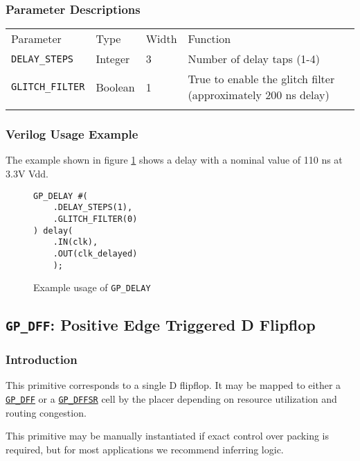 \documentclass[11pt]{article}
\newcommand{\tokenstyle}[1]{\texttt{#1}}
\newcommand{\whenstyle}[1]{{\fontseries{sb}\selectfont#1}}
\newcommand{\tokenref}[2]{\hyperref[#2]{\tokenstyle{#1}}}
\newcommand{\thinhline}{\Xhline{1\arrayrulewidth}}
\newcommand{\thickhline}{\Xhline{2.5\arrayrulewidth}}
\begin{document}
\subsubsection{Parameter Descriptions}

\begin{tabularx}{\textwidth}{lllX}
\thinhline
\whenstyle{Parameter} & \whenstyle{Type} & \whenstyle{Width} & \whenstyle{Function} \\
\thickhline
\tokenstyle{DELAY\_STEPS} & Integer & 3 & Number of delay taps (1-4) \\
\thinhline
\tokenstyle{GLITCH\_FILTER} & Boolean & 1 & True to enable the glitch filter (approximately 200 ns delay) \\
\thinhline
\end{tabularx}

\subsubsection{Verilog Usage Example}

The example shown in figure \ref{gp-delay-example} shows a delay with a nominal value of 110 ns at 3.3V Vdd.

\begin{figure}[h]
\begin{lstlisting}
GP_DELAY #(
	.DELAY_STEPS(1),
	.GLITCH_FILTER(0)
) delay(
	.IN(clk),
	.OUT(clk_delayed)
	);
\end{lstlisting}
\caption{Example usage of \tokenstyle{GP\_DELAY}}
\label{gp-delay-example}
\end{figure}


\pagebreak
\subsection{\tokenstyle{GP\_DFF}: Positive Edge Triggered D Flipflop}
\label{gp-dff}

\subsubsection{Introduction}
This primitive corresponds to a single D flipflop. It may be mapped to either a \tokenref{GP\_DFF}{gp-dff} or a
\tokenref{GP\_DFFSR}{gp-dffsr} cell by the placer depending on resource utilization and routing congestion.

This primitive may be manually instantiated if exact control over packing is required, but for most applications we
recommend inferring logic.
\end{document}
